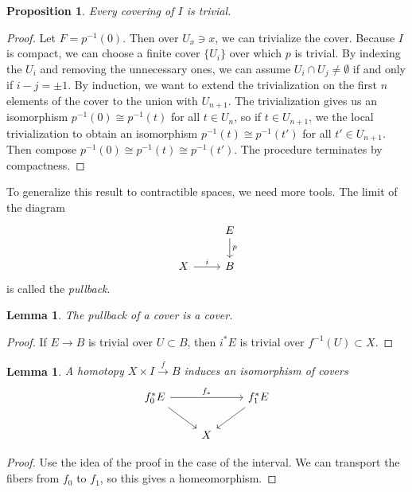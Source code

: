 \documentclass[leqno, openany]{memoir}
\newtheorem{prop}[thm]{Proposition}
\newtheorem{lem}[thm]{Lemma}
\theoremstyle{definition}
\theoremstyle{remark}
\theoremstyle{plain}
\theoremstyle{definition}
\theoremstyle{remark}
\begin{document}
\begin{prop} Every covering of $I$ is trivial.  \end{prop}

\begin{proof} Let $F = p^{-1}(0)$. Then over $U_x \ni x$, we can trivialize the
    cover. Because $I$ is compact, we can choose a finite cover $\{ U_i\}$ over
    which $p$ is trivial. By indexing the $U_i$ and removing the unnecessary
    ones, we can assume $U_i \cap U_j \neq \emptyset$ if and only if $i - j =
    \pm 1$. By induction, we want to extend the trivialization on the first $n$
    elements of the cover to the union with $U_{n+1}$. The trivialization gives
    us an isomorphism $p^{-1}(0) \cong p^{-1}(t)$ for all $t \in U_n$, so if $t
    \in U_{n+1}$, we the local trivialization to obtain an isomorphism
    $p^{-1}(t) \cong p^{-1}(t')$ for all $t' \in U_{n+1}$. Then compose
    $p^{-1}(0) \cong p^{-1}(t) \cong p^{-1}(t')$. The procedure terminates by
    compactness.  \end{proof}

To generalize this result to contractible spaces, we need more tools. The limit
    of the diagram \begin{equation} \begin{tikzcd} & E \arrow{d}{p} \\ X
    \arrow{r}{i} & B \end{tikzcd} \end{equation} is called the
    \textit{pullback}. 

\begin{lem} The pullback of a cover is a cover.  \end{lem}

\begin{proof} If $E \to B$ is trivial over $U \subset B$, then $i^* E$ is
trivial over $f^{-1}(U) \subset X$.  \end{proof}

\begin{lem} A homotopy $X \times I \xrightarrow{f} B$ induces an isomorphism of
    covers \begin{equation} \begin{tikzcd} f_0^* E \arrow{rr}{f_*} \arrow{dr} &
    & f_1^* E \arrow{dl} \\ & X & \end{tikzcd} \end{equation} \end{lem}

\begin{proof} Use the idea of the proof in the case of the interval. We can
transport the fibers from $f_0$ to $f_1$, so this gives a homeomorphism.
\end{proof}
\end{document}
